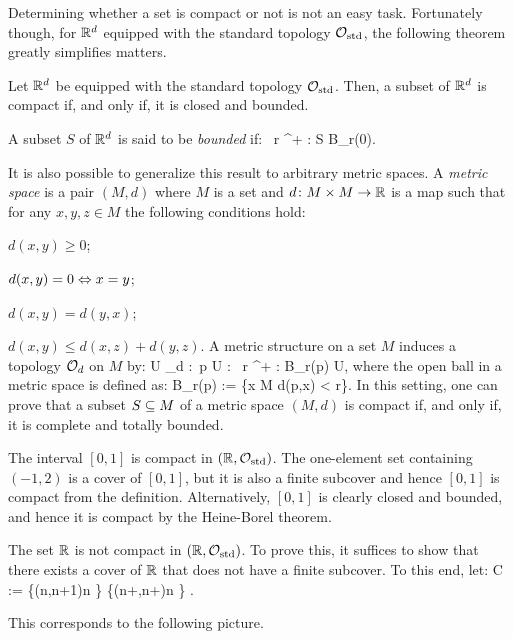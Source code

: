 Determining whether a set is compact or not is not an easy task. Fortunately though, for $\mathbb{R}^d$ equipped with the standard topology $\mathcal{O}_\mathrm{std}$, the following theorem greatly simplifies matters.

Let $\mathbb{R}^d$ be equipped with the standard topology $\mathcal{O}_\mathrm{std}$. Then, a subset of $\mathbb{R}^d$ is compact if, and only if, it is closed and bounded.
\et

A subset $S$ of $\mathbb{R}^d$ is said to be \emph{bounded} if:
\bse
\exists \, r \in \R^+ : S \se B_r(0). 
\ese

\br
It is also possible to generalize this result to arbitrary metric spaces. A \emph{metric space} is a pair $(M,d)$ where $M$ is a set and $d\colon M\times M \to \mathbb{R}$ is a map such that for any $x,y,z \in M$ the following conditions hold:
\ben
\item[i)] $d(x,y) \geq 0$;
\item[ii)] $d(x,y) = 0 \Leftrightarrow x = y$;
\item[iii)] $d(x,y) = d(y,x) $;
\item[iv)] $d(x,y)\leq d(x,z)+d(y,z)$.
\een
A metric structure on a set $M$ induces a topology $\mathcal{O}_d$ on $M$ by:
\bse
U \in \cO_d :\eqv \forall \, p \in U : \exists \, r \in \R^+ : B_r(p) \se U,
\ese
where the open ball in a metric space is defined as:
\bse
B_r(p) := \{x \in M \mid d(p,x) < r\}.
\ese
In this setting, one can prove that a subset $S\subseteq M$ of a metric space $(M,d)$ is compact if, and only if, it is complete and totally bounded.
\er

\be
The interval $[0,1]$ is compact in $(\mathbb{R},\mathcal{O}_\mathrm{std})$. The one-element set containing $(-1,2)$ is a cover of $[0,1]$, but it is also a finite subcover and hence $[0,1]$ is compact from the definition. Alternatively, $[0,1]$ is clearly closed and bounded, and hence it is compact by the Heine-Borel theorem.
\ee

\be
The set $\mathbb{R}$ is not compact in $(\mathbb{R},\mathcal{O}_\mathrm{std})$. To prove this, it suffices to show that there exists a cover of $\mathbb{R}$ that does not have a finite subcover. To this end, let:
\bse
C := \{(n,n+1)\mid n \in \Z\} \cup \{(n+,n+)\mid n \in \Z\} .
\ese

This corresponds to the following picture.

